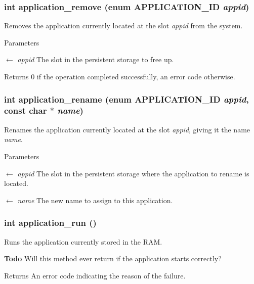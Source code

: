 \subsubsection[{application\_\-remove}]{\setlength{\rightskip}{0pt plus 5cm}int application\_\-remove (enum {\bf APPLICATION\_\-ID} {\em appid})}\label{db/d45/manager_8h_a2b5d68b3e2ea266b131e3e3c9802d6f2}
Removes the application currently located at the slot {\itshape appid\/} from the system.


\begin{DoxyParams}{Parameters}
\item[\mbox{$\leftarrow$} {\em appid}]The slot in the persistent storage to free up.\end{DoxyParams}
\begin{DoxyReturn}{Returns}
0 if the operation completed successfully, an error code otherwise. 
\end{DoxyReturn}
\subsubsection[{application\_\-rename}]{\setlength{\rightskip}{0pt plus 5cm}int application\_\-rename (enum {\bf APPLICATION\_\-ID} {\em appid}, \/  const char $\ast$ {\em name})}\label{db/d45/manager_8h_ad90e25f8acafe8f6f861849aa89f56a2}
Renames the application currently located at the slot {\itshape appid\/}, giving it the name {\itshape name\/}.


\begin{DoxyParams}{Parameters}
\item[\mbox{$\leftarrow$} {\em appid}]The slot in the persistent storage where the application to rename is located. \item[\mbox{$\leftarrow$} {\em name}]The new name to assign to this application. \end{DoxyParams}
\subsubsection[{application\_\-run}]{\setlength{\rightskip}{0pt plus 5cm}int application\_\-run ()}\label{db/d45/manager_8h_afa031199ed298d4b9c5326db517d1c12}
Runs the application currently stored in the RAM.

\begin{Desc}
\item[{\bf Todo}]Will this method ever return if the application starts correctly?\end{Desc}
\begin{DoxyReturn}{Returns}
An error code indicating the reason of the failure. 
\end{DoxyReturn}
